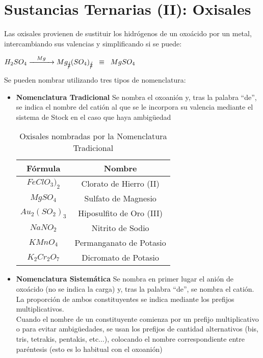 \section{Sustancias Ternarias (II): Oxisales}
Las oxisales provienen de sustituir los hidrógenos de un oxoácido por un metal, intercambiando sus valencias y simplificando si se puede:
\begin{center}
	$H_2SO_4  \xrightarrow{\hspace{0,3cm}Mg\hspace{0,3cm}} Mg_{\cancel{2}}(SO_4)_{\cancel{2}} \hspace{0,2cm}\equiv\hspace{0,2cm} MgSO_4$
\end{center}
Se pueden nombrar utilizando tres tipos de nomenclatura:\\
\begin{itemize}
	\item \textbf{Nomenclatura Tradicional} Se nombra el oxoanión y, tras la palabra “de”, se indica el nombre del catión al que se le incorpora su valencia mediante el sistema de Stock en el caso que haya ambigüedad
	\begin{table}[h!]
		\centering
		\begin{tabular}{c|c}
			Fórmula&Nombre\\ \hline
			$FeClO_3)_2$&Clorato de Hierro (II)\\
			$MgSO_4$&Sulfato de Magnesio\\
			$Au_2(SO_2)_3$&Hiposulfito de Oro (III)\\
			$NaNO_2$&Nitrito de Sodio\\
			$KMnO_4$&Permanganato de Potasio\\
			$K_2Cr_2O_7$&Dicromato de Potasio\\ \hline
		\end{tabular}
			\caption{Oxisales nombradas por la Nomenclatura Tradicional}
	\end{table}
	\item\textbf{Nomenclatura Sistemática} Se nombra en primer lugar el anión de oxoácido (no se indica la carga) y, tras la palabra “de”, se nombra el catión. La proporción de ambos constituyentes se indica mediante los prefijos multiplicativos.\\ 
	Cuando el nombre de un constituyente comienza por un prefijo multiplicativo o para evitar ambigüedades, se usan los prefijos de cantidad alternativos (bis, tris, tetrakis, pentakis, etc...), colocando el nombre correspondiente entre paréntesis (esto es lo habitual con el oxoanión)\\

\end{itemize}
